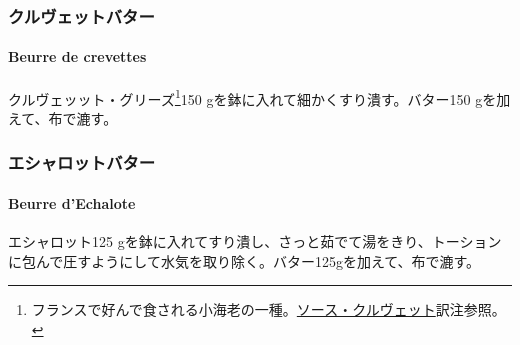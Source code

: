 \begin{recette}
\maeaki

\hypertarget{ux30afux30ebux30f4ux30a7ux30c3ux30c8ux30d0ux30bfux30fc}{%
\subsubsection{クルヴェットバター}\label{ux30afux30ebux30f4ux30a7ux30c3ux30c8ux30d0ux30bfux30fc}}

\hypertarget{beurre-de-crevettes}{%
\paragraph{Beurre de crevettes}\label{beurre-de-crevettes}}


クルヴェッット・グリーズ\footnote{フランスで好んで食される小海老の一種。\protect\hyperlink{sauce-aux-crevettes}{ソース・クルヴェット}訳注参照。}150
gを鉢に入れて細かくすり潰す。バター150 gを加えて、布で漉す。

\maeaki

\hypertarget{ux30a8ux30b7ux30e3ux30edux30c3ux30c8ux30d0ux30bfux30fc}{%
\subsubsection{エシャロットバター}\label{ux30a8ux30b7ux30e3ux30edux30c3ux30c8ux30d0ux30bfux30fc}}

\hypertarget{beurre-d-echalote}{%
\paragraph{Beurre d'Echalote}\label{beurre-d-echalote}}


エシャロット125
gを鉢に入れてすり潰し、さっと茹でて湯をきり、トーションに包んで圧すようにして水気を取り除く。バター125gを加えて、布で漉す。


\end{recette}
